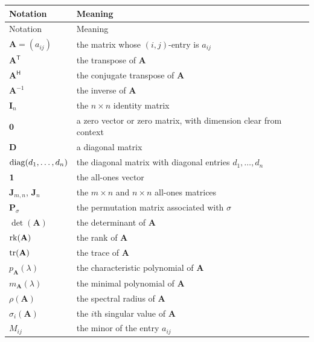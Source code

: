     {\small
    \renewcommand{\arraystretch}{1.18}
    \begin{longtable}{@{}L{0.27\textwidth}L{0.65\textwidth}@{}}
        \toprule
        Notation & Meaning \\
        \midrule
        \endfirsthead

        \toprule
        Notation & Meaning \\
        \midrule
        \endhead

        \bottomrule
        \endlastfoot

        $\mathbf{A}=(a_{ij})$ & the matrix whose $(i,j)$-entry is $a_{ij}$ \\
        $\mathbf{A}^{\mathsf T}$ & the transpose of $\mathbf{A}$ \\
        $\mathbf{A}^{\mathsf H}$ & the conjugate transpose of $\mathbf{A}$ \\
        $\mathbf{A}^{-1}$ & the inverse of $\mathbf{A}$ \\
        $\mathbf{I}_n$ & the $n\times n$ identity matrix \\
        $\mathbf{0}$ & a zero vector or zero matrix, with dimension clear from context \\
        $\mathbf{D}$ & a diagonal matrix \\
        $\operatorname{diag}(d_1,\dots,d_n)$ & the diagonal matrix with diagonal entries $d_1,\dots,d_n$ \\
        $\mathbf{1}$ & the all-ones vector \\
        $\mathbf{J}_{m,n}$, $\mathbf{J}_n$ & the $m\times n$ and $n\times n$ all-ones matrices \\
        $\mathbf{P}_\sigma$ & the permutation matrix associated with $\sigma$ \\
        $\det(\mathbf{A})$ & the determinant of $\mathbf{A}$ \\
        $\operatorname{rk}(\mathbf{A})$ & the rank of $\mathbf{A}$ \\
        $\operatorname{tr}(\mathbf{A})$ & the trace of $\mathbf{A}$ \\
        $p_{\mathbf{A}}(\lambda)$ & the characteristic polynomial of $\mathbf{A}$ \\
        $m_{\mathbf{A}}(\lambda)$ & the minimal polynomial of $\mathbf{A}$ \\
        $\rho(\mathbf{A})$ & the spectral radius of $\mathbf{A}$ \\
        $\sigma_i(\mathbf{A})$ & the $i$th singular value of $\mathbf{A}$ \\
        $M_{ij}$ & the minor of the entry $a_{ij}$ \\

\end{longtable}}
